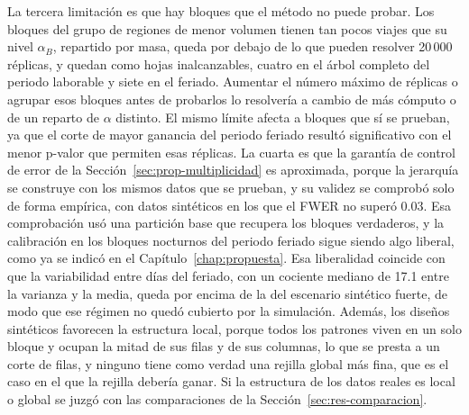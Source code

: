 La tercera limitación es que hay bloques que el método no puede probar. Los
bloques del grupo de regiones de menor volumen tienen tan pocos viajes que su
nivel $\alpha_B$, repartido por masa, queda por debajo de lo que pueden resolver
20\,000 réplicas, y quedan como hojas inalcanzables, cuatro en el árbol completo
del periodo laborable y siete en el feriado. Aumentar el número máximo de
réplicas o agrupar esos bloques antes de probarlos lo resolvería a cambio de
más cómputo o de un reparto de $\alpha$ distinto. El mismo límite afecta a bloques
que sí se prueban, ya que el corte de mayor ganancia del periodo feriado resultó
significativo con el menor p-valor que permiten esas réplicas. La cuarta es que la garantía de
control de error de la Sección~\ref{sec:prop-multiplicidad} es aproximada, porque
la jerarquía se construye con los mismos datos que se prueban, y su validez se
comprobó solo de forma empírica, con datos sintéticos en los que el FWER no superó
0.03. Esa comprobación usó una partición base que recupera los bloques
verdaderos, y la calibración en los bloques nocturnos del periodo feriado sigue
siendo algo liberal, como ya se indicó en el Capítulo~\ref{chap:propuesta}. Esa
liberalidad coincide con que la variabilidad entre días del feriado, con un
cociente mediano de 17.1 entre la varianza y la media, queda por encima de la del
escenario sintético fuerte, de modo que ese régimen no quedó cubierto por la
simulación. Además, los diseños sintéticos favorecen la estructura local,
porque todos los patrones viven en un solo bloque y ocupan la mitad de sus filas y
de sus columnas, lo que se presta a un corte de filas, y ninguno tiene como verdad
una rejilla global más fina, que es el caso en el que la rejilla debería ganar. Si
la estructura de los datos reales es local o global se juzgó con las comparaciones
de la Sección~\ref{sec:res-comparacion}.

